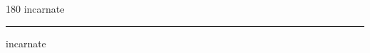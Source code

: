 
\begin{frame}
\begin{center}
\begin{turn}{180}
{\fontsize{2.5cm}{1em}\selectfont incarnate}
\end{turn}
\vspace{1em}\par  
\hrule
\vspace{1em}\par  
{\fontsize{2.5cm}{1em}\selectfont incarnate}
\end{center}
\end{frame}
